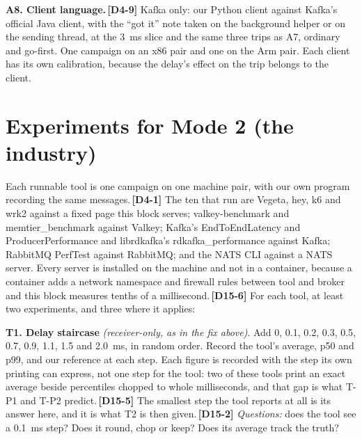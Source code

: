 \documentclass[11pt]{article}
\newcommand{\gl}[1]{{\color{soft}\itshape\small (#1)}}
\newcommand{\chgold}[1]{\,{\color{oldcol}\bfseries\footnotesize[#1]}}
\begin{document}
\textbf{A8. Client language.}\chgold{D4-9} Kafka only: our Python client against Kafka's official Java client, with the ``got it'' note taken on the background helper or on the sending thread, at the 3~ms slice and the same three trips as A7, ordinary and go-first. One campaign on an x86 pair and one on the Arm pair. Each client has its own calibration, because the delay's effect on the trip belongs to the client.

\section{Experiments for Mode 2 (the industry)}

Each runnable tool is one campaign on one machine pair, with our own program recording the same messages.\chgold{D4-1} The ten that run are Vegeta, hey, k6 and wrk2 against a fixed page this block serves; valkey-benchmark and memtier\_benchmark against Valkey; Kafka's EndToEndLatency and ProducerPerformance and librdkafka's rdkafka\_performance against Kafka; RabbitMQ PerfTest against RabbitMQ; and the NATS CLI against a NATS server. Every server is installed on the machine and not in a container, because a container adds a network namespace and firewall rules between tool and broker and this block measures tenths of a millisecond.\chgold{D15-6} For each tool, at least two experiments, and three where it applies:

\textbf{T1. Delay staircase} \gl{receiver-only, as in the fix above}. Add 0, 0.1, 0.2, 0.3, 0.5, 0.7, 0.9, 1.1, 1.5 and 2.0~ms, in random order. Record the tool's average, p50 and p99, and our reference at each step. Each figure is recorded with the step its own printing can express, not one step for the tool: two of these tools print an exact average beside percentiles chopped to whole milliseconds, and that gap is what T-P1 and T-P2 predict.\chgold{D15-5} The smallest step the tool reports at all is its answer here, and it is what T2 is then given.\chgold{D15-2} \emph{Questions:} does the tool see a 0.1~ms step? Does it round, chop or keep? Does its average track the truth?
\end{document}
